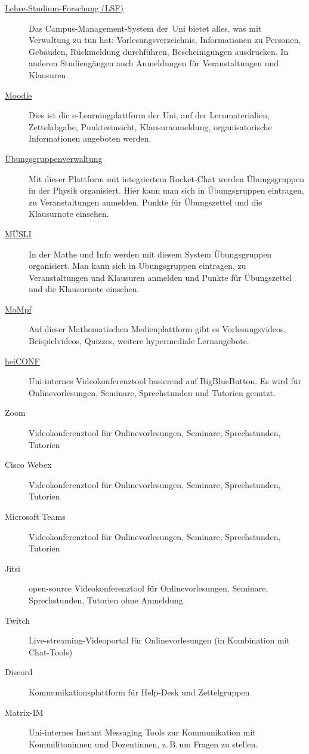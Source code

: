 \begin{description}
	\item[\href{https://lsf.uni-heidelberg.de/}{Lehre-Studium-Forschung (LSF)}] Das Campus-Management-System der~Uni bietet alles, was mit Verwaltung zu tun hat: Vorlesungsverzeichnis, Informationen zu Personen, Gebäuden, Rückmeldung durchführen, Bescheinigungen ausdrucken. In anderen Studiengängen auch Anmeldungen für Veranstaltungen und Klausuren.
	\item[\href{https://moodle.uni-heidelberg.de}{Moodle}] Dies ist die e-Learningplattform der Uni, auf der Lernmaterialien, Zettelabgabe, Punkteeinsicht, Klausuranmeldung, organisatorische Informationen angeboten werden.
	\item[\href{https://uebungen.physik.uni-heidelberg.de}{Übungsgruppenverwaltung}] Mit dieser Plattform mit integriertem Rocket-Chat werden Übungsgruppen in der Physik organisiert. Hier kann man sich in Übungsgruppen eintragen, zu Veranstaltungen anmelden, Punkte für Übungszettel und die Klausurnote einsehen.
	\item[\href{https://muesli.mathi.uni-heidelberg.de}{MÜSLI}] In der Mathe und Info werden mit diesem System Übungsgruppen organisiert. Man kann sich in Übungsgruppen eintragen, zu Veranstaltungen und Klausuren anmelden und Punkte für Übungszettel und die Klausurnote einsehen.
	\item[\href{https://mampf.mathi.uni-heidelberg.de}{MaMpf}] Auf dieser Mathematischen Medienplattform gibt es Vorlesungsvideos, Beispielvideos, Quizzes, weitere hypermediale Lernangebote.
	\item[\href{https://heiconf.uni-heidelberg.de}{heiCONF}] Uni-internes Videokonferenztool basierend auf BigBlueButton. Es wird für Onlinevorlesungen, Seminare, Sprechstunden und Tutorien genutzt.
	\item[Zoom] Videokonferenztool für Onlinevorlesungen, Seminare, Sprechstunden, Tutorien
	\item[Cisco Webex] Videokonferenztool für Onlinevorlesungen, Seminare, Sprechstunden, Tutorien
	\item[Microsoft Teams] Videokonferenztool für Onlinevorlesungen, Seminare, Sprechstunden, Tutorien
	\item[Jitsi] open-source Videokonferenztool für Onlinevorlesungen, Seminare, Sprechstunden, Tutorien ohne Anmeldung
	\item[Twitch] Live-streaming-Videoportal für Onlinevorlesungen (in Kombination mit Chat-Tools)
	\item[Discord] Kommunikationsplattform für Help-Desk und Zettelgruppen
	\item[Matrix-IM] Uni-internes Instant Messaging Tools zur Kommunikation mit Kommilitoninnen und Dozentinnen, z.\,B.\,um Fragen zu stellen.
\end{description}


